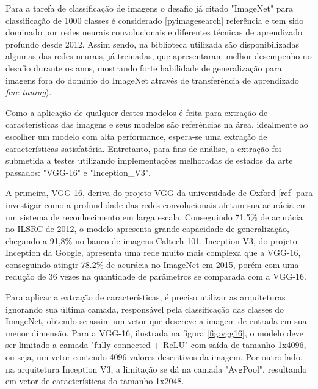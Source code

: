 \documentclass[12pt]{report}
\begin{document}
Para a tarefa de classificação de imagens o desafio já citado "ImageNet" para classificação de 1000 classes é considerado [pyimagesearch] referência e tem sido dominado por redes neurais convolucionais e diferentes técnicas de aprendizado profundo desde 2012. Assim sendo, na biblioteca utilizada são disponibilizadas algumas das redes neurais, já treinadas, que apresentaram melhor desempenho no desafio durante os anos, mostrando forte habilidade de generalização para imagens fora do domínio do ImageNet através de transferência de aprendizado  \textit{fine-tuning}).

Como a aplicação de qualquer destes modelos é feita para extração de características das imagens e seus modelos são referências na área, idealmente ao escolher um modelo com alta performance, espera-se uma extração de características satisfatória. Entretanto, para fins de análise, a extração foi submetida a testes utilizando implementações melhoradas de estados da arte passados: "VGG-16" e "Inception\_V3".

A primeira, VGG-16, deriva do projeto VGG da universidade de Oxford [ref] para investigar como a profundidade das redes convolucionais afetam sua acurácia em um sistema de reconhecimento em larga escala. Conseguindo 71,5\% de acurácia no ILSRC de 2012, o modelo apresenta grande capacidade de generalização, chegando a 91,8\% no banco de imagens Caltech-101. Inception V3, do projeto Inception da Google, apresenta uma rede muito mais complexa que a VGG-16, conseguindo atingir 78.2\% de acurácia no ImageNet em 2015, porém com uma redução de 36 vezes na quantidade de parâmetros se comparada com a VGG-16. 


Para aplicar a extração de características, é preciso utilizar as arquiteturas ignorando sua última camada, responsável pela classificação das classes do ImageNet, obtendo-se assim um vetor que descreve a imagem de entrada em sua menor dimensão. Para a VGG-16, ilustrada na figura \ref{fig:vgg16}, o modelo deve ser limitado a camada "fully connected + ReLU" com saída de tamanho 1x4096, ou seja, um vetor contendo 4096 valores descritivos da imagem. Por outro lado, na arquitetura Inception V3, a limitação se dá na camada "AvgPool", resultando em vetor de características do tamanho 1x2048.
\end{document}
